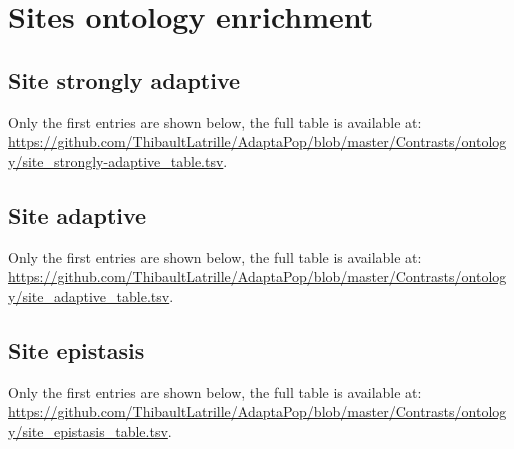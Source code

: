 \documentclass{article}
\begin{document}


\section{Sites ontology enrichment}

\subsection{Site strongly adaptive}
Only the first entries are shown below, the full table is available at:
\url{https://github.com/ThibaultLatrille/AdaptaPop/blob/master/Contrasts/ontology/site_strongly-adaptive_table.tsv}.


\subsection{Site adaptive}
Only the first entries are shown below, the full table is available at:
\url{https://github.com/ThibaultLatrille/AdaptaPop/blob/master/Contrasts/ontology/site_adaptive_table.tsv}.


\subsection{Site epistasis}
Only the first entries are shown below, the full table is available at:
\url{https://github.com/ThibaultLatrille/AdaptaPop/blob/master/Contrasts/ontology/site_epistasis_table.tsv}.


\printbibliography
\end{document}
